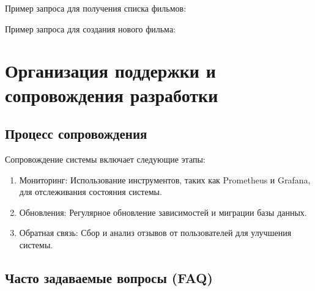 Пример запроса для получения списка фильмов:

\begin{Shaded}
\begin{Highlighting}[]
 
\end{Highlighting}
\end{Shaded}

Пример запроса для создания нового фильма:

\begin{Shaded}
\begin{Highlighting}[]
    
\end{Highlighting}
\end{Shaded}

\hypertarget{ux43eux440ux433ux430ux43dux438ux437ux430ux446ux438ux44f-ux43fux43eux434ux434ux435ux440ux436ux43aux438-ux438-ux441ux43eux43fux440ux43eux432ux43eux436ux434ux435ux43dux438ux44f-ux440ux430ux437ux440ux430ux431ux43eux442ux43aux438}{%
\section{Организация поддержки и сопровождения
разработки}\label{ux43eux440ux433ux430ux43dux438ux437ux430ux446ux438ux44f-ux43fux43eux434ux434ux435ux440ux436ux43aux438-ux438-ux441ux43eux43fux440ux43eux432ux43eux436ux434ux435ux43dux438ux44f-ux440ux430ux437ux440ux430ux431ux43eux442ux43aux438}}

\hypertarget{ux43fux440ux43eux446ux435ux441ux441-ux441ux43eux43fux440ux43eux432ux43eux436ux434ux435ux43dux438ux44f}{%
\subsection*{Процесс
сопровождения}\label{ux43fux440ux43eux446ux435ux441ux441-ux441ux43eux43fux440ux43eux432ux43eux436ux434ux435ux43dux438ux44f}}

Сопровождение системы включает следующие этапы: 
\begin{enumerate}
    \item 
Мониторинг:
Использование инструментов, таких как Prometheus и Grafana, для
отслеживания состояния системы. 
\item 
Обновления: Регулярное
обновление зависимостей и миграции базы данных. 
\item 
Обратная
связь: Сбор и анализ отзывов от пользователей для улучшения системы.
\end{enumerate}
\hypertarget{ux447ux430ux441ux442ux43e-ux437ux430ux434ux430ux432ux430ux435ux43cux44bux435-ux432ux43eux43fux440ux43eux441ux44b-faq}{%
\subsection*{Часто задаваемые вопросы
(FAQ)}\label{ux447ux430ux441ux442ux43e-ux437ux430ux434ux430ux432ux430ux435ux43cux44bux435-ux432ux43eux43fux440ux43eux441ux44b-faq}}

